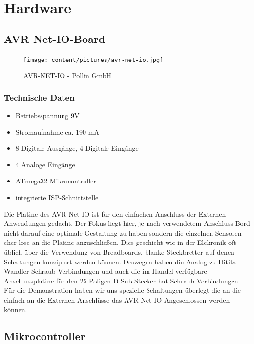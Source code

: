 \chapter{Hardware}
\section{AVR Net-IO-Board}
\begin{figure}[h]
\centering
\texttt{[image: content/pictures/avr-net-io.jpg]}
\caption{AVR-NET-IO - Pollin GmbH}
\label{fig:B3}
\end{figure}

\subsection{Technische Daten}
\begin{itemize}
  \item Betriebsspannung 9V
  \item Stromaufnahme ca. 190 mA
  \item 8 Digitale Ausgänge, 4 Digitale Eingänge
  \item 4 Analoge Eingänge
  \item ATmega32 Mikrocontroller
  \item integrierte ISP-Schnittstelle
\end{itemize}

Die Platine des AVR-Net-IO ist für den einfachen Anschluss der Externen
Anwendungen gedacht. Der Fokus liegt hier, je nach verwendetem Anschluss Bord
nicht darauf eine optimale Gestaltung zu haben sondern die einzelnen Sensoren
eher lose an die Platine anzuschließen. Dies geschieht wie in der Elekronik oft
üblich über die Verwendung von Breadboards, blanke Steckbretter auf
denen Schaltungen konzipiert werden können. Deswegen haben die Analog zu Ditital
Wandler Schraub-Verbindungen und auch die im Handel verfügbare Anschlussplatine
für den 25 Poligen D-Sub Stecker hat Schraub-Verbindungen. Für die Demonstration
haben wir uns spezielle Schaltungen überlegt die an die einfach an die Externen
Anschlüsse das AVR-Net-IO Angeschlossen werden können. 

\section{Mikrocontroller}
